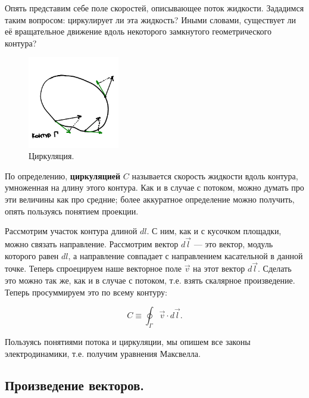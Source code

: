 \documentclass[12pt,a4paper]{article}
\numberwithin{equation}{section}
\numberwithin{equation}{section}
\begin{document}
Опять представим себе поле скоростей, описывающее поток
жидкости. Зададимся таким вопросом: циркулирует ли эта жидкость? Иными
словами, существует ли её вращательное движение вдоль некоторого
замкнутого геометрического контура? 

\begin{figure}
  \vspace{-1.5cm}
  \begin{center}
    \includegraphics[width=4cm,height=4cm]{curl.pdf}
  \end{center}
  \vspace{-0.7cm}
  \caption{Циркуляция.}
  \label{fig:curl}
\end{figure}


По определению, \textbf{циркуляцией} $C$ называется скорость жидкости вдоль
контура, умноженная на длину этого контура. Как и в случае с потоком,
можно думать про эти величины как про средние; более аккуратное
определение можно получить, опять пользуясь понятием проекции. 

Рассмотрим участок контура длиной $dl$. С ним, как и с кусочком
площадки, можно связать направление. Рассмотрим вектор $d\vec{l}$ ---
это вектор, модуль которого равен $dl$, а направление совпадает с
направлением касательной в данной точке. Теперь спроецируем наше
векторное поле $\vec{v}$ на этот вектор $d\vec{l}$. Сделать это можно
так же, как и в случае с потоком, т.е. взять скалярное
произведение. Теперь просуммируем это по всему контуру:

\begin{equation}
  \label{eq:curl}
  C \equiv \oint_\Gamma \vec{v} \cdot d \vec{l}.
\end{equation}

Пользуясь понятиями потока и циркуляции, мы опишем все законы
электродинамики, т.е. получим уравнения Максвелла. 

\subsection{Произведение векторов.}
\label{sec:vector_product}
\end{document}
